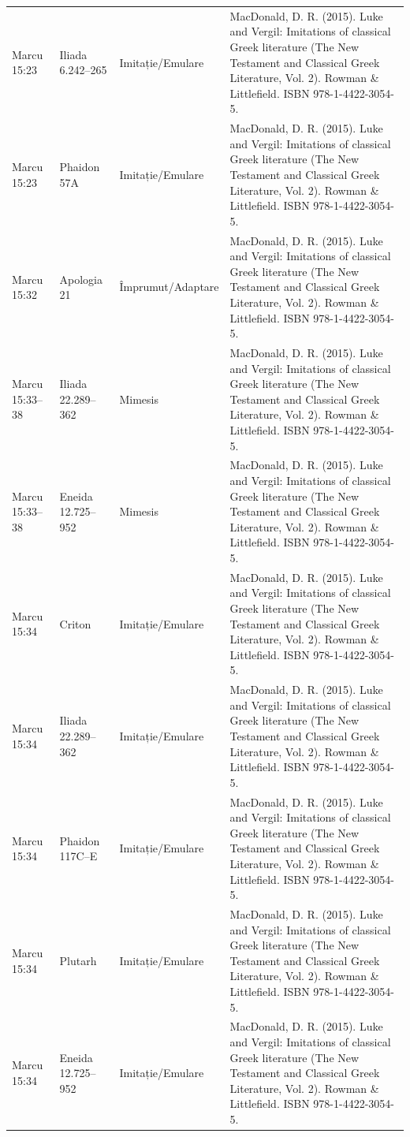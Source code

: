 \documentclass[12pt,a4paper,twoside,openany]{book}
\begin{document}
\begin{longtable}{L{1.4cm}L{1.7cm}L{3.1cm}L{8.4cm}}
Marcu 15:23 & Iliada 6.242–265 & Imitație/Emulare & MacDonald, D. R. (2015). Luke and Vergil: Imitations of classical Greek literature (The New Testament and Classical Greek Literature, Vol. 2). Rowman \& Littlefield. ISBN 978-1-4422-3054-5. \\
Marcu 15:23 & Phaidon 57A & Imitație/Emulare & MacDonald, D. R. (2015). Luke and Vergil: Imitations of classical Greek literature (The New Testament and Classical Greek Literature, Vol. 2). Rowman \& Littlefield. ISBN 978-1-4422-3054-5. \\
Marcu 15:32 & Apologia 21 & Împrumut/Adaptare & MacDonald, D. R. (2015). Luke and Vergil: Imitations of classical Greek literature (The New Testament and Classical Greek Literature, Vol. 2). Rowman \& Littlefield. ISBN 978-1-4422-3054-5. \\
Marcu 15:33–38 & Iliada 22.289–362 & Mimesis & MacDonald, D. R. (2015). Luke and Vergil: Imitations of classical Greek literature (The New Testament and Classical Greek Literature, Vol. 2). Rowman \& Littlefield. ISBN 978-1-4422-3054-5. \\
Marcu 15:33–38 & Eneida 12.725–952 & Mimesis & MacDonald, D. R. (2015). Luke and Vergil: Imitations of classical Greek literature (The New Testament and Classical Greek Literature, Vol. 2). Rowman \& Littlefield. ISBN 978-1-4422-3054-5. \\
Marcu 15:34 & Criton & Imitație/Emulare & MacDonald, D. R. (2015). Luke and Vergil: Imitations of classical Greek literature (The New Testament and Classical Greek Literature, Vol. 2). Rowman \& Littlefield. ISBN 978-1-4422-3054-5. \\
Marcu 15:34 & Iliada 22.289–362 & Imitație/Emulare & MacDonald, D. R. (2015). Luke and Vergil: Imitations of classical Greek literature (The New Testament and Classical Greek Literature, Vol. 2). Rowman \& Littlefield. ISBN 978-1-4422-3054-5. \\
Marcu 15:34 & Phaidon 117C–E & Imitație/Emulare & MacDonald, D. R. (2015). Luke and Vergil: Imitations of classical Greek literature (The New Testament and Classical Greek Literature, Vol. 2). Rowman \& Littlefield. ISBN 978-1-4422-3054-5. \\
Marcu 15:34 & Plutarh & Imitație/Emulare & MacDonald, D. R. (2015). Luke and Vergil: Imitations of classical Greek literature (The New Testament and Classical Greek Literature, Vol. 2). Rowman \& Littlefield. ISBN 978-1-4422-3054-5. \\
Marcu 15:34 & Eneida 12.725–952 & Imitație/Emulare & MacDonald, D. R. (2015). Luke and Vergil: Imitations of classical Greek literature (The New Testament and Classical Greek Literature, Vol. 2). Rowman \& Littlefield. ISBN 978-1-4422-3054-5. \\

\end{longtable}
\end{document}
